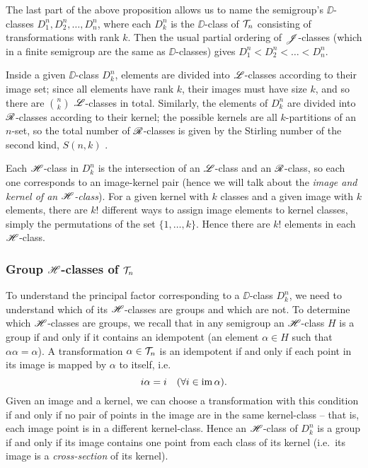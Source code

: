 The last part of the above proposition allows us to name the semigroup's
$\DD$-classes $D_1^n, D_2^n, \dots, D_n^n$, where each $D_k^n$ is the
$\DD$-class of $\mathcal{T}_n$ consisting of transformations with rank $k$.  Then the
usual partial ordering of $\mathrel{\mathscr{J}}$-classes (which in a finite semigroup are the
same as $\DD$-classes) gives $D_1^n < D_2^n < \dots < D_n^n$.

Inside a given $\DD$-class $D_k^n$, elements are divided into $\mathrel{\mathscr{L}}$-classes
according to their image set; since all elements have rank $k$, their images
must have size $k$, and so there are $\binom{n}{k}$ $\mathrel{\mathscr{L}}$-classes in total.
Similarly, the elements of $D_k^n$ are divided into $\mathrel{\mathscr{R}}$-classes according to
their kernel; the possible kernels are all $k$-partitions of an $n$-set, so the
total number of $\mathrel{\mathscr{R}}$-classes is given by the Stirling number of the second
kind, $S(n,k)$ .

Each $\mathrel{\mathscr{H}}$-class in $D_k^n$ is the intersection of an $\mathrel{\mathscr{L}}$-class and an
$\mathrel{\mathscr{R}}$-class, so each one corresponds to an image-kernel pair (hence we will talk
about the \textit{image and kernel of an $\mathrel{\mathscr{H}}$-class}).  For a given kernel with
$k$ classes and a given image with $k$ elements, there are $k!$ different ways
to assign image elements to kernel classes, simply the permutations of the set
$\{1, \dots, k\}$.  Hence there are $k!$ elements in each $\mathrel{\mathscr{H}}$-class.

\subsubsection{Group $\mathrel{\mathscr{H}}$-classes of $\mathcal{T}_n$}
To understand the principal factor corresponding to a $\DD$-class $D_k^n$, we need
to understand which of its $\mathrel{\mathscr{H}}$-classes are groups and which are not.  To
determine which $\mathrel{\mathscr{H}}$-classes are groups, we recall that in any semigroup an
$\mathrel{\mathscr{H}}$-class $H$ is a group if and only if it contains an idempotent (an element
$\alpha \in H$ such that $\alpha \alpha = \alpha$).  A transformation
$\alpha \in \mathcal{T}_n$ is an idempotent if and only if each point in its image is
mapped by $\alpha$ to itself, i.e.
$$i \alpha = i \quad (\forall i \in \operatorname{im} \alpha).$$
Given an image and a kernel, we can choose a transformation with this condition
if and only if no pair of points in the image are in the same
kernel-class -- that is, each image point is in a different kernel-class.  Hence
an $\mathrel{\mathscr{H}}$-class of $D_k^n$ is a group if and only if its image contains one point
from each class of its kernel (i.e.~its image is a \textit{cross-section} of its
kernel).  


